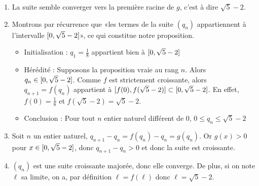 \documentclass[12pt,a4paper,french]{article}
\begin{document}
\begin{solution}
\begin{enumerate}
\begin{enumerate}
\begin{center}
\end{center}
\item La suite semble converger vers la première racine de $g$, c'est à dire $\sqrt{5} - 
2$.
\item Montrons par récurrence que «les termes de la suite $(q_n)$ appartiennent à 
l'intervalle $\intv*{0}{\sqrt{5}-2}$», ce qui constitue notre proposition.
\begin{itemize}
\item Initialisation : $q_1 = \frac{1}{8}$ appartient bien à $\intv*{0}{\sqrt{5}-2}$
\item Hérédité : Supposons la proposition vraie au rang $n$. Alors $q_n \in 
\intv*{0}{\sqrt{5}-2}$. Comme $f$ est strictement croissante, alors $q_{n+1} = f(q_n)$ appartient à $\intv*{f(0)}{f(\sqrt{5} -2)} \subset \intv*{0}{\sqrt{5}-2}$. En effet, $f(0) = \frac18$ et $f(\sqrt{5} -2) = \sqrt{5} -2$.
\item Conclusion : Pour tout $n$ entier naturel différent de 0, $ 0 \leqslant q_n 
\leqslant \sqrt{5} - 2$
\end{itemize}
\item Soit $n$ un entier naturel, $q_{n+1} - q_n = f(q_n) - q_n = g(q_n)$. Or $g(x) > 0$ 
pour $x \in \intv*{0}{\sqrt{5}-2}$, donc $q_{n+1} - q_n > 0$ et donc la suite est 
croissante.
\item $(q_n)$ est une suite croissante majorée, donc elle converge. De plus, si on note 
$\ell$ sa limite, on a, par définition $\ell = f(\ell)$ donc $\ell = \sqrt{5} - 2$.
    \end{enumerate}
    \end{enumerate}
\end{solution}
\end{document}
